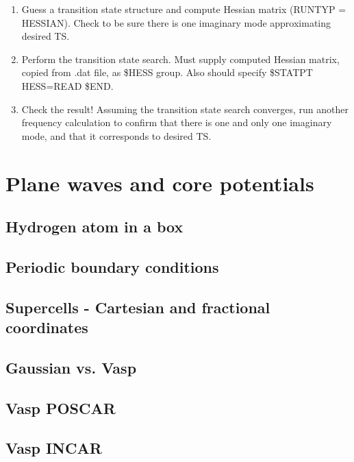 \documentclass[11pt]{article}
\begin{document}
\begin{enumerate}
\item Guess a transition state structure and compute Hessian matrix (RUNTYP = HESSIAN).  Check to be sure there is one imaginary mode approximating desired TS.
\item Perform the transition state search.  Must supply computed Hessian matrix, copied from .dat file, as \$HESS group.  Also should specify \$STATPT HESS=READ \$END.
\item Check the result!  Assuming the transition state search converges, run another frequency calculation to confirm that there is one and only one imaginary mode, and that it corresponds to desired TS.
\end{enumerate}

\section{Plane waves and core potentials}
\label{sec:orgb34232c}

\subsection{Hydrogen atom in a box}
\label{sec:orgef10fde}

\subsection{Periodic boundary conditions}
\label{sec:orgcdb1511}

\subsection{Supercells - Cartesian and fractional coordinates}
\label{sec:orga95c803}

\subsection{Gaussian vs. Vasp}
\label{sec:org355f1b3}

\subsection{Vasp POSCAR}
\label{sec:org64c9635}

\subsection{Vasp INCAR}
\label{sec:org7061cf4}
\end{document}
